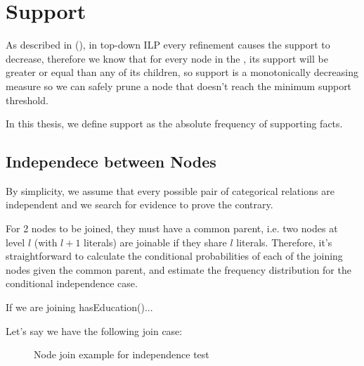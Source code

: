 \section{Support}

As described in (\cite{LavracDz94}), in top-down ILP every refinement causes the support to decrease, therefore we know that for every node in the \graphname, its support will be greater or equal than any of its children, so support is a monotonically decreasing measure so we can safely prune a node that doesn't reach the minimum support threshold.

In this thesis, we define support as the absolute frequency of supporting facts.


\subsection{Independece between Nodes}

By simplicity, we assume that every possible pair of categorical relations are independent and we search for evidence to prove the contrary.

For 2 nodes to be joined, they must have a common parent, i.e. two nodes at level $l$ (with $l+1$ literals) are joinable if they share $l$ literals. Therefore, it's straightforward to calculate the conditional probabilities of each of the joining nodes given the common parent, and estimate the frequency distribution for the conditional independence case.

If we are joining hasEducation()...

Let's say we have the following join case:
 
\begin{figure}[!h]
  \caption{Node join example for independence test}
  \centering
  \label{fig:joinIndepExample}
\end{figure}



